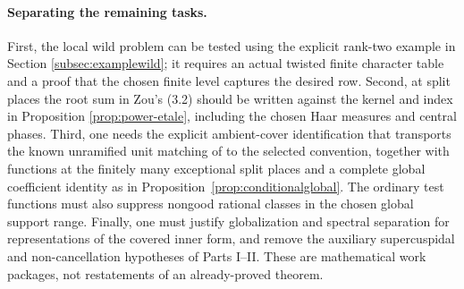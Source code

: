 \documentclass[11pt]{article}
\theoremstyle{plain}
\theoremstyle{definition}
\begin{document}
\paragraph{Separating the remaining tasks.}
First, the local wild problem can be tested using the explicit
rank-two example in Section \ref{subsec:examplewild}; it requires
an actual twisted finite character table and a proof that the
chosen finite level captures the desired row.  Second, at split
places the root sum in Zou's (3.2) should be written against the
kernel and index in Proposition \ref{prop:power-etale}, including
the chosen Haar measures and central phases.  Third, one needs the explicit ambient-cover identification
that transports the known unramified unit matching of
\cite[\S12]{FK} to the selected convention, together with
functions at the finitely many exceptional split places and a
complete global coefficient identity as in
Proposition~\ref{prop:conditionalglobal}. The ordinary test
functions must also suppress nongood rational classes in the
chosen global support range.
Finally, one must justify globalization and spectral separation
for representations of the covered inner form, and remove the
auxiliary supercuspidal and non-cancellation hypotheses of Parts
I--II.  These are mathematical work packages, not restatements of
an already-proved theorem.
\end{document}
